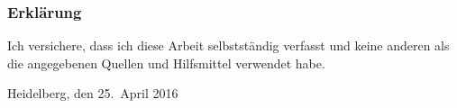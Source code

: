   
\subsubsection*{Erklärung}
\label{sub:Erklärung}

Ich versichere, dass ich diese Arbeit selbstständig verfasst und keine 
anderen als die angegebenen Quellen und Hilfsmittel verwendet habe.

\vspace{2\baselineskip}

Heidelberg, den 25.\ April 2016 \hspace{5em} \hrulefill


